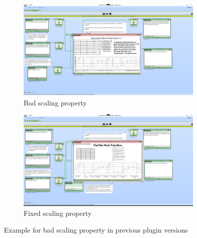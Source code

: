 \begin{figure}
\begin{subfigure}{\textwidth}
\centering
\includegraphics[width=\textwidth]{figures/ct2/scaling-bug-example.png}
\caption{Bad scaling property}
\label{fig:plugin.scaling.bug}
\end{subfigure}
\begin{subfigure}{\textwidth}
\centering
\includegraphics[width=\textwidth]{figures/ct2/scaling-bug-fixed.png}
\caption{Fixed scaling property}
\label{fig:plugin.scaling.fix}
\end{subfigure}
\caption{Example for bad scaling property in previous plugin versions}
\end{figure}
